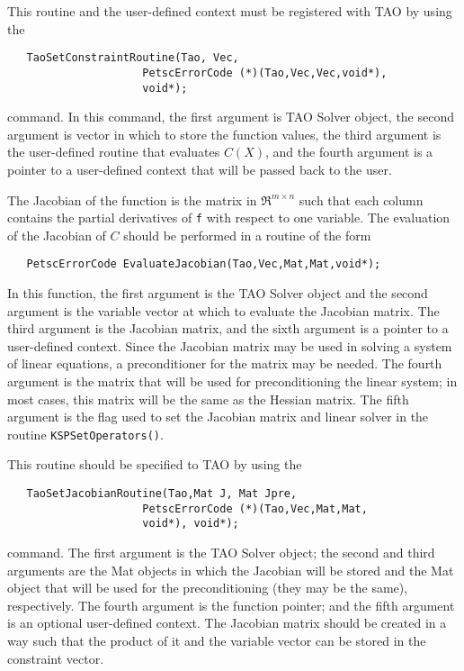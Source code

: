 This routine and the user-defined context 
must be registered with TAO by using the
\begin{verbatim}
   TaoSetConstraintRoutine(Tao, Vec,
                     PetscErrorCode (*)(Tao,Vec,Vec,void*),
                     void*);
\end{verbatim}
command. 
\noindent
In this command, the first argument is TAO Solver object,
the second argument is vector in which to store the function values,
the third argument is the user-defined routine that evaluates $C(X)$,
and the fourth argument is a pointer to a user-defined context that will
be passed back to the user.

The Jacobian of the function is the matrix in $\Re^{m \times n}$
such that each column contains the partial derivatives of {\tt f} with respect
to one variable. 
The evaluation of the Jacobian of $C$ should be performed in a routine
of the form
\begin{verbatim}
   PetscErrorCode EvaluateJacobian(Tao,Vec,Mat,Mat,void*);
\end{verbatim}
\noindent
In this function, the first argument is the TAO Solver object and the 
second argument is the variable vector at which to evaluate the 
Jacobian matrix. The third argument is the Jacobian matrix,
and the sixth argument is a pointer to a user-defined context.
Since the Jacobian matrix may be used in solving a system of linear equations,
a preconditioner for the matrix may be needed.  The fourth argument is the matrix that will be used
for preconditioning the linear system; in most cases, this
matrix will be the same as the Hessian matrix.  The fifth
argument is the flag used to set the Jacobian matrix and
linear solver in the routine {\tt KSPSetOperators()}.

This routine should be specified to TAO by using the
\begin{verbatim}
   TaoSetJacobianRoutine(Tao,Mat J, Mat Jpre,
                     PetscErrorCode (*)(Tao,Vec,Mat,Mat, 
                     void*), void*);
\end{verbatim}
\noindent
command.
The first argument is the TAO Solver object; the second
and third arguments are the Mat objects in which the Jacobian will be stored
and the Mat object that will be used for the preconditioning (they may
be the same), respectively. 
The fourth argument is the function pointer; and the fifth argument is
an optional user-defined context.
The Jacobian matrix should be created in a way such that the product of 
it and the variable vector can be stored in the constraint vector.

